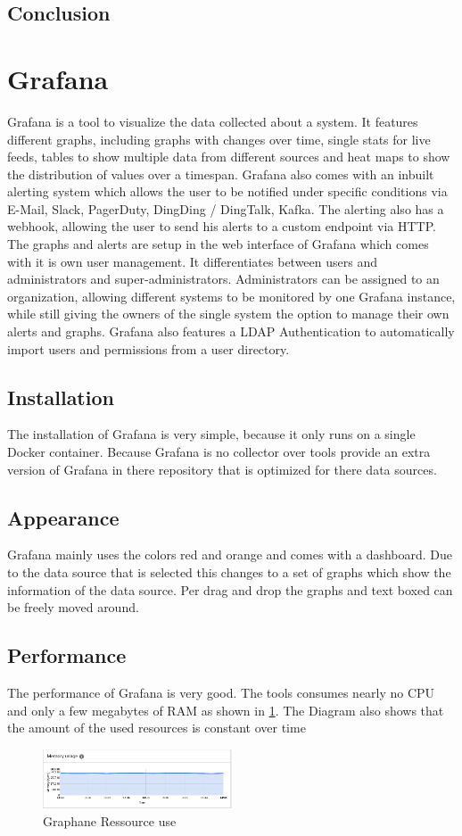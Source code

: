 \subsection{Conclusion}


\section{Grafana}
\label{grafana} %
Grafana is a tool to visualize the data collected about a system. It features different graphs, including graphs with changes over time, single stats for live feeds, tables to show multiple data from different sources and heat maps to show the distribution of values over a timespan.
Grafana also comes with an inbuilt alerting system which allows the user to be notified under specific conditions via E-Mail, Slack, PagerDuty, DingDing / DingTalk, Kafka. The alerting also has a webhook, allowing the user to send his alerts to a custom endpoint via HTTP.
The graphs and alerts are setup in the web interface of Grafana which comes with it is own user management. It differentiates between users and administrators and super-administrators. Administrators can be assigned to an organization, allowing different systems to be monitored by one Grafana instance, while still giving the owners of the single system the option to manage their own alerts and graphs.
Grafana also features a LDAP Authentication to automatically import users and permissions from a user directory.
\subsection{Installation}
The installation of Grafana is very simple, because it only runs on a single Docker container. Because Grafana is no collector over tools provide an extra version of Grafana in there repository that is optimized for there data sources.
\subsection{Appearance}%
Grafana mainly uses the colors red and orange and comes with a dashboard. Due to the data source that is selected this changes to a set of graphs which show the information of the data source. Per drag and drop the graphs and text boxed can be freely moved around. 
\subsection{Performance}
The performance of Grafana is very good. The tools consumes nearly no CPU and only a few megabytes of RAM as shown in \cref{fig:Grafan_RAM}. The Diagram also shows that the amount of the used resources is constant over time
\begin{figure}
\centering
\includegraphics[width=0.5\textwidth]{Bilder/Performance/Grafan_RAM}
\caption{Graphane Ressource use}
\label{fig:Grafan_RAM}
\end{figure}
